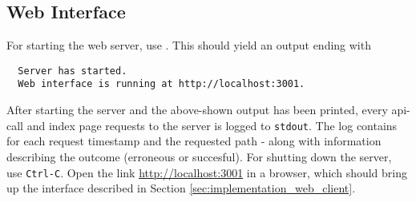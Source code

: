 \subsection{Web Interface}

For starting the web server, use . This should yield an output ending with
\begin{lstlisting}
  Server has started.
  Web interface is running at http://localhost:3001.
\end{lstlisting}

\noindent
After starting the server and the above-shown output has been printed, every api-call and index page requests to the server is logged to \texttt{stdout}.
The log contains for each request timestamp and the requested path - along with information describing the outcome (erroneous or succesful).
For shutting down the server, use \texttt{Ctrl-C}.
Open the link \url{http://localhost:3001} in a browser, which should bring up the interface described in Section \ref{sec:implementation_web_client}.
